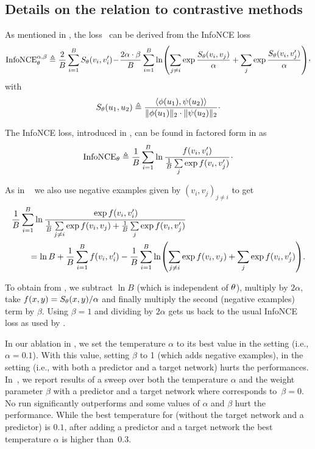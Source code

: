 \subsection{Details on the relation to contrastive methods}
\label{app:neg-examples}

As mentioned in , the \algo loss~ can be derived from the InfoNCE loss
\begin{equation}
\label{eq:infoNCE_beta}
\text{InfoNCE}^{\alpha, \beta}_{\netparams} \eqdef
 \frac{2}{B}\sum_{i=1}^B S_\netparams(v_i, v'_i)\!-\! \frac{2\alpha\cdot\beta}{B}\sum_{i=1}^B \ln\pa{\sum\limits_{j \neq i} \exp \frac{S_\netparams(v_i, v_j)}{\alpha} + \sum\limits_{j} \exp \frac{S_\netparams(v_i, v'_j)}{\alpha}}\CommaBin
\end{equation}
with
\begin{equation}
    S_{\theta}(u_1, u_2) \triangleq \frac{\langle \phi(u_1), \psi(u_2) \rangle }{\|\phi(u_1)\|_2\cdot \|\psi(u_2)\|_2}\cdot
\end{equation}


The InfoNCE loss, introduced in \cite{CPC}, can be found in factored form in \cite{poole2019variational} as
\begin{equation}
\text{InfoNCE}_{{\theta}} \triangleq
 \frac{1}{B}\sum_{i=1}^B \ln\cfrac{f(v_i, v'_i)}{\frac{1}{B}\sum\limits_{j} \exp f(v_i, v'_j)}\,\cdot
\end{equation}

As in \simclr~\cite{SimCLR} we also use negative examples given by $(v_i, v_j)_{j\neq i}$ to get
\begin{align}
 &\frac{1}{B}\sum_{i=1}^B \ln\cfrac{\exp f(v_i, v'_i)}{\frac{1}{B}\sum\limits_{j\neq i} \exp f(v_i, v_j) + \frac{1}{B}\sum\limits_{j} \exp f(v_i, v'_j)} \\
 &\qquad = \ln B + \frac{1}{B}\sum_{i=1}^Bf(v_i, v'_i) - \frac{1}{B}\sum_{i=1}^B \ln\pa{\sum\limits_{j\neq i} \exp f(v_i, v_j) + \sum\limits_{j} \exp f(v_i, v'_j)}.
 \label{eq:infoNCE_bis}
\end{align}

To obtain  from , we subtract $\ln B$ (which is independent of ${\theta}$), multiply by $2\alpha$, take $f(x,y) = S_{\theta}(x,y)/\alpha$ and finally multiply the second (negative examples) term by $\beta$. Using $\beta=1$ and dividing by $2\alpha$ gets us back to the usual InfoNCE loss as used by \simclr. 


In our ablation in , we set the temperature $\alpha$ to its best value in the \simclr setting (i.e., $\alpha = 0.1$). With this value, setting $\beta$ to 1 (which adds negative examples), in the \algo setting (i.e., with both a predictor and a target network) hurts the performances. 
In~, we report results of a sweep over both the temperature $\alpha$ and the weight parameter
$\beta$ with a predictor and a target network where \algo corresponds to~$\beta = 0$. 
No run significantly outperforms \algo and some values of $\alpha$ and $\beta$ hurt the performance. While the best temperature for \simclr (without the target network and a predictor) is $0.1$, after adding a predictor and a target network the best temperature $\alpha$ is higher than~$0.3$.

